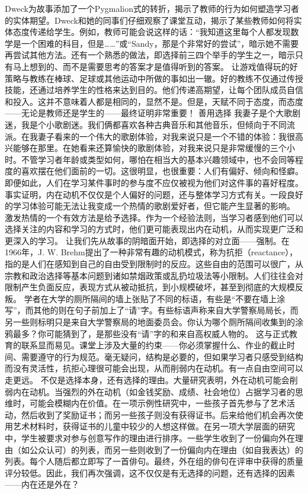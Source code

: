 Dweck为故事添加了一个Pygmalion式的转折，揭示了教师的行为如何塑造学习者的实体期望。Dweck和她的同事们仔细观察了课堂互动，揭示了某些教师如何将实体态度传递给学生。例如，教师可能会说这样的话：“我知道这里每个人都发现数学是一个困难的科目，但是……”或“Sandy，那是个非常好的尝试”，暗示她不需要再尝试其他方法。还有一个熟悉的做法，即选择前三四个举手的学生之一，暗示只有马上想到的、而不是需要思考的答案才是值得听到的答案。
让游戏值得玩的好策略与教练在棒球、足球或其他运动中所做的事如出一辙。好的教练不仅通过传授技能，还通过培养学生的性格来达到目的。他们传递高期望，让每个团队成员自信和投入。这并不意味着人都是相同的，显然不是。但是，天赋不同于态度，而态度——无论是教师还是学生的——最终证明非常重要！
善用选择
我妻子是个大歌剧迷，我是个小歌剧迷。我们俩都喜欢各种古典音乐和其他音乐，但倾向于不同流派。在我妻子看来的一个伟大的歌剧体验，对我来说只是一个不错的体验：我很高兴能够在那里。在她看来还算愉快的歌剧体验，对我来说只是非常缓慢的三个小时。不管学习者年龄或类型如何，哪怕在相当大的基本兴趣领域中，也不会同等程度的喜欢摆在他们面前的一切。这很明显，也很重要：人们有偏好、倾向和怪癖。
即便如此，人们在学习某件事时的参与度不应仅被视为他们对这件事的喜好程度。事实证明，内在动机不仅仅是个人偏好的问题，还与整体学习方式有关。一段良好的学习体验可能无法让我变成一个热情的歌剧爱好者，但它能产生显著的影响。
激发热情的一个有效方法是给予选择。作为一个经验法则，当学习者感到他们可以选择关注的内容和学习的方式时，他们更可能表现出内在动机，从而实现更广泛和更深入的学习。
让我们先从故事的阴暗面开始，即选择的对立面——强制。在1966年，J. W. Brehm提出了一种非常有趣的动机模式，称为抗拒（reactance），指的是人们在感知到自己的自由受到限制时的反应。这些自由的范围可以很广，从宗教和政治选择等基本问题到诸如禁烟政策或乱扔垃圾法等小限制。人们往往会对限制产生负面反应，表现方式从被动抵抗，到小规模破坏，甚至到彻底的大规模反叛。
学者在大学的厕所隔间的墙上张贴了不同的标语，有些是“不要在墙上涂写”，而其他的则在句子前加上了“请”字。有些标语声称来自大学警察局局长，而另一些则标明只是来自大学警察局的地面委员会。你认为哪个厕所隔间收集到的涂鸦最多？你可能猜到了，是那些没有“请”字的和来自高权威人物的。
这与正式教育的联系显而易见。课堂上涉及大量的约束——你必须掌握什么、作业的截止时间、需要遵守的行为规范。毫无疑问，结构是必要的，但如果学习者只感受到结构而没有灵活性，抗拒心理很可能会出现，从而削弱内在动机。有一点自由空间可以走更远。
不仅是选择本身，还有选择的理由。大量研究表明，外在动机可能会削弱内在动机。当强烈的外在动机（如金钱奖励、成绩、社会地位）占据学习者的思维时，可能会模糊内在价值。在一项示例性研究中，一些孩子首先参与了艺术活动，然后收到了奖励证书；而另一些孩子则没有获得证书。后来给他们机会再次使用艺术材料时，获得证书的儿童中较少的人想这样做。在另一项大学层面的研究中，学生被要求对参与创意写作的理由进行排序。一些学生收到了一份偏向外在理由（如公众认可）的列表，而另一些则收到了一份偏向内在理由（如自我表达）的列表。每个人随后都立即写了一首俳句。最终，外在组的俳句在评审中获得的质量评分较低。因此，我们再次强调，这不仅仅是有无选择的问题，还有选择的因素——内在还是外在？
